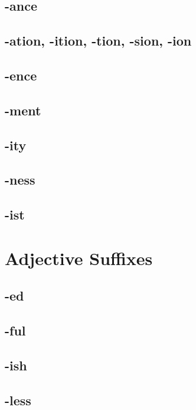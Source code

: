 \subsection{-ance}

\subsection{-ation, -ition, -tion, -sion, -ion}

\subsection{-ence}

\subsection{-ment}

\subsection{-ity}

\subsection{-ness}

\subsection{-ist}

\section{Adjective Suffixes}

\subsection{-ed}

\subsection{-ful}

\subsection{-ish}

\subsection{-less}

